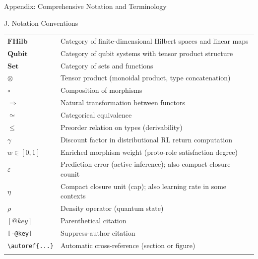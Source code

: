 \documentclass[
  ignorenonframetext,
]{beamer}
\begin{document}
\begin{frame}[fragile]{Appendix: Comprehensive Notation and Terminology}
\begin{block}{J. Notation Conventions}
{\begin{longtable}[]{@{}
  >{\raggedright\arraybackslash}p{}
  >{\raggedright\arraybackslash}p{}@{}}
\(\mathbf{FHilb}\) & Category of finite-dimensional Hilbert spaces and
linear maps \\
\(\mathbf{Qubit}\) & Category of qubit systems with tensor product
structure \\
\(\mathbf{Set}\) & Category of sets and functions \\
\(\otimes\) & Tensor product (monoidal product, type concatenation) \\
\(\circ\) & Composition of morphisms \\
\(\Rightarrow\) & Natural transformation between functors \\
\(\simeq\) & Categorical equivalence \\
\(\leq\) & Preorder relation on types (derivability) \\
\(\gamma\) & Discount factor in distributional RL return computation \\
\(w \in [0,1]\) & Enriched morphism weight (proto-role satisfaction
degree) \\
\(\varepsilon\) & Prediction error (active inference); also compact
closure counit \\
\(\eta\) & Compact closure unit (cap); also learning rate in some
contexts \\
\(\rho\) & Density operator (quantum state) \\
\([@key]\) & Parenthetical citation \\
\texttt{{[}-@key{]}} & Suppress-author citation \\
\texttt{\textbackslash{}autoref\{...\}} & Automatic cross-reference
(section or figure) \\
\bottomrule\noalign{}
\end{longtable}
}
\end{block}
\end{frame}
\end{document}

